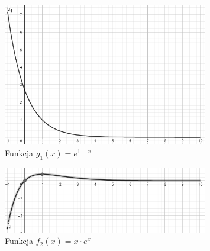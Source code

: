 \documentclass[11pt]{article}
\begin{document}
        \newpage

        \begin{figure}
            \centering
            \includegraphics[width=0.8\textwidth]{img/ex6_g1.png}
            \caption{Funkcja $g_1(x) = e^{1 - x}$}
            \label{fig:ex6_g1}
        \end{figure}

        \begin{figure}
            \centering
            \includegraphics[width=0.8\textwidth]{img/ex6_f2.png}
            \caption{Funkcja $f_2(x) = x \cdot e^{x}$}
            \label{fig:ex6_f2}
        \end{figure}
\end{document}
